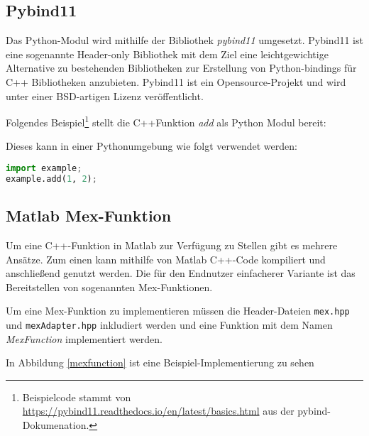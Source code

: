 \subsection{Pybind11}

Das Python-Modul wird mithilfe der Bibliothek \textit{pybind11} umgesetzt.
Pybind11 ist eine sogenannte Header-only Bibliothek mit dem Ziel eine leichtgewichtige Alternative zu bestehenden Bibliotheken zur Erstellung  von
Python-bindings für C++ Bibliotheken anzubieten.
Pybind11\cite{pybind} ist ein Opensource-Projekt und wird unter einer BSD-artigen Lizenz veröffentlicht. 

Folgendes Beispiel\footnote{Beispielcode stammt von \url{https://pybind11.readthedocs.io/en/latest/basics.html} aus der pybind-Dokumenation\cite{pybind}.} stellt die C++Funktion \textit{add} als Python Modul bereit:
\begin{center}

\end{center}
Dieses kann in einer Pythonumgebung wie folgt verwendet werden:

\begin{center}
\begin{lstlisting}[language=Python]
import example;
example.add(1, 2);
\end{lstlisting}
\end{center}



\subsection{Matlab Mex-Funktion}

Um eine C++-Funktion in Matlab zur Verfügung zu Stellen gibt es mehrere Ansätze.
Zum einen kann mithilfe von Matlab C++-Code kompiliert und anschließend genutzt werden. 
Die für den Endnutzer einfacherer Variante ist das Bereitstellen von sogenannten Mex-Funktionen.

Um eine Mex-Funktion zu implementieren müssen die Header-Dateien \texttt{mex.hpp} und \texttt{mexAdapter.hpp} inkludiert werden
und eine Funktion mit dem Namen \textit{MexFunction} implementiert werden. 

In Abbildung \ref{mexfunction} ist eine Beispiel-Implementierung zu sehen 
\begin{center}
    
    \label{mexfunction}
\end{center}

